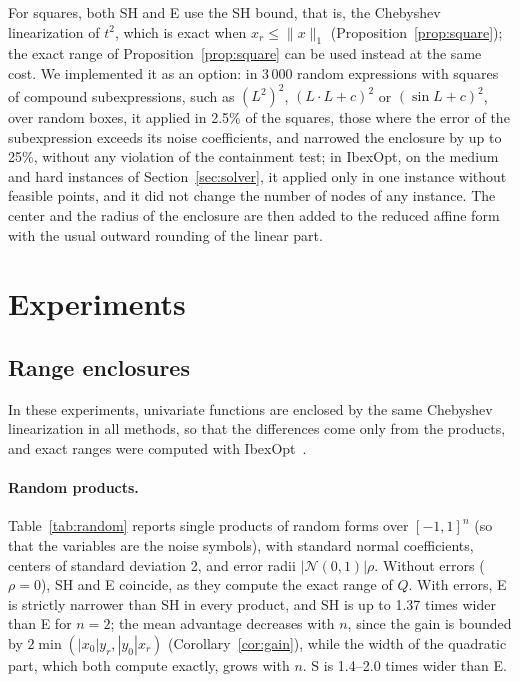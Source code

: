 \documentclass[10pt]{article}
\theoremstyle{definition}
\begin{document}
For squares, both SH and E use the SH bound, that is, the Chebyshev linearization of $t^2$, which is exact when $x_r\le\|x\|_1$ (Proposition~\ref{prop:square}); the exact range of Proposition~\ref{prop:square} can be used instead at the same cost. We implemented it as an option: in 3\,000 random expressions with squares of compound subexpressions, such as $(L^2)^2$, $(L\cdot L+c)^2$ or $(\sin L+c)^2$, over random boxes, it applied in 2.5\% of the squares, those where the error of the subexpression exceeds its noise coefficients, and narrowed the enclosure by up to 25\%, without any violation of the containment test; in IbexOpt, on the medium and hard instances of Section~\ref{sec:solver}, it applied only in one instance without feasible points, and it did not change the number of nodes of any instance. The center and the radius of the enclosure are then added to the reduced affine form with the usual outward rounding of the linear part.

\section{Experiments}
\label{sec:experiments}

\subsection{Range enclosures}

In these experiments, univariate functions are enclosed by the same Chebyshev linearization in all methods, so that the differences come only from the products, and exact ranges were computed with IbexOpt~\cite{chabert2009}.

\paragraph{Random products.} Table~\ref{tab:random} reports single products of random forms over $[-1,1]^n$ (so that the variables are the noise symbols), with standard normal coefficients, centers of standard deviation 2, and error radii $|\mathcal N(0,1)|\rho$. Without errors ($\rho=0$), SH and E coincide, as they compute the exact range of $Q$. With errors, E is strictly narrower than SH in every product, and SH is up to 1.37 times wider than E for $n=2$; the mean advantage decreases with $n$, since the gain is bounded by $2\min(|x_0|y_r,|y_0|x_r)$ (Corollary~\ref{cor:gain}), while the width of the quadratic part, which both compute exactly, grows with $n$. S is 1.4--2.0 times wider than E.
\end{document}
